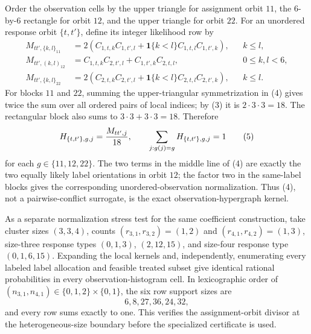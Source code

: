 Order the observation cells by the upper triangle for assignment orbit \(11\), the \(6\)-by-\(6\) rectangle for orbit \(12\), and the upper triangle for orbit \(22\).  For an unordered response orbit \(\{t,t'\}\), define its integer likelihood row by
\[
\begin{aligned}
M_{tt',\{k,l\}_{11}}
 &=2\left(C_{1,t,k}C_{1,t',l}
       +\mathbf 1\{k<l\}C_{1,t,l}C_{1,t',k}\right), && k\le l,\\
M_{tt',(k,l)_{12}}
 &=C_{1,t,k}C_{2,t',l}+C_{1,t',k}C_{2,t,l}, &&0\le k,l<6,\\
M_{tt',\{k,l\}_{22}}
 &=2\left(C_{2,t,k}C_{2,t',l}
       +\mathbf 1\{k<l\}C_{2,t,l}C_{2,t',k}\right), && k\le l.
\end{aligned}                                                               \tag{4}
\]
For blocks \(11\) and \(22\), summing the upper-triangular symmetrization in (4) gives twice the sum over all ordered pairs of local indices; by (3) it is \(2\cdot3\cdot3=18\).  The rectangular block also sums to \(3\cdot3+3\cdot3=18\).  Therefore
\[
H_{\{t,t'\},g,j}={M_{tt',j}\over18},
\qquad
\sum_{j:g(j)=g}H_{\{t,t'\},g,j}=1                                        \tag{5}
\]
for each \(g\in\{11,12,22\}\).  The two terms in the middle line of (4) are exactly the two equally likely label orientations in orbit \(12\); the factor two in the same-label blocks gives the corresponding unordered-observation normalization.  Thus (4), not a pairwise-conflict surrogate, is the exact observation-hypergraph kernel.

As a separate normalization stress test for the same coefficient construction, take cluster sizes \((3,3,4)\), counts \((r_{3,1},r_{3,2})=(1,2)\) and \((r_{4,1},r_{4,2})=(1,3)\), size-three response types \((0,1,3)\), \((2,12,15)\), and size-four response type \((0,1,6,15)\).  Expanding the local kernels and, independently, enumerating every labeled label allocation and feasible treated subset give identical rational probabilities in every observation-histogram cell.  In lexicographic order of \((n_{3,1},n_{4,1})\in\{0,1,2\}\times\{0,1\}\), the six row support sizes are
\[
6, 8, 27, 36, 24, 32,                                                  \tag{6}
\]
and every row sums exactly to one.  This verifies the assignment-orbit divisor at the heterogeneous-size boundary before the specialized certificate is used.


